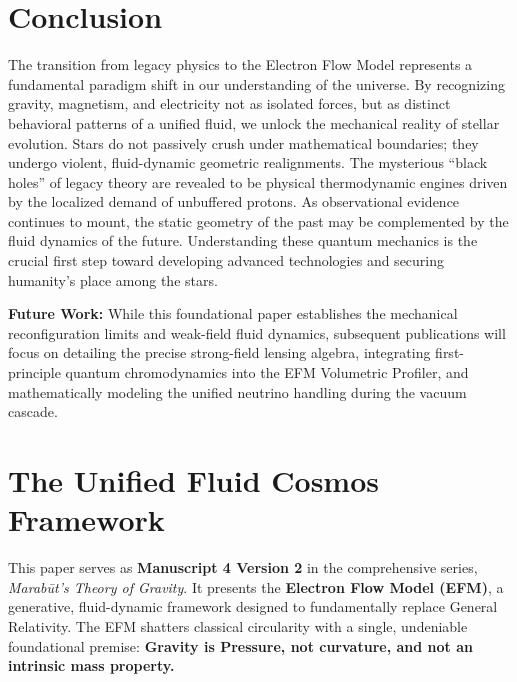 \documentclass[11pt, a4paper]{article}
\begin{document}
\section{Conclusion}
  The transition from legacy physics to the Electron Flow Model represents a fundamental paradigm shift in our understanding of the universe. By recognizing gravity, magnetism, and electricity not as isolated forces, but as distinct behavioral patterns of a unified fluid, we unlock the mechanical reality of stellar evolution. Stars do not passively crush under mathematical boundaries; they undergo violent, fluid-dynamic geometric realignments. The mysterious ``black holes'' of legacy theory are revealed to be physical thermodynamic engines driven by the localized demand of unbuffered protons. As observational evidence continues to mount, the static geometry of the past may be complemented by the fluid dynamics of the future. Understanding these quantum mechanics is the crucial first step toward developing advanced technologies and securing humanity's place among the stars.

  \textbf{Future Work:} While this foundational paper establishes the mechanical reconfiguration limits and weak-field fluid dynamics, subsequent publications will focus on detailing the precise strong-field lensing algebra, integrating first-principle quantum chromodynamics into the EFM Volumetric Profiler, and mathematically modeling the unified neutrino handling during the vacuum cascade.

\clearpage
\section*{The Unified Fluid Cosmos Framework}
  This paper serves as \textbf{Manuscript 4 Version 2} in the comprehensive series, \textit{Marab\={u}t's Theory of Gravity}. It presents the \textbf{Electron Flow Model (EFM)}, a generative, fluid-dynamic framework designed to fundamentally replace General Relativity. The EFM shatters classical circularity with a single, undeniable foundational premise: \textbf{Gravity is Pressure, not curvature, and not an intrinsic mass property.}
\end{document}

